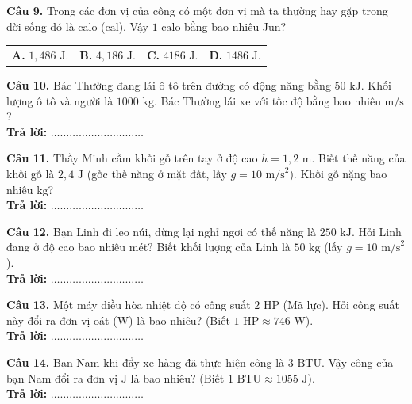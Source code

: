 \documentclass{article}
\begin{document}
\fontsize{28}{36}\selectfont
\textbf{Câu 9.} Trong các đơn vị của công có một đơn vị mà ta thường hay gặp trong đời sống đó là calo ($\text{cal}$). Vậy $1\text{ calo}$ bằng bao nhiêu Jun?
\vspace{16pt}

\begin{tabularx}{\linewidth}{@{}X X X X@{}}
\textbf{A.} $1,486\text{ J}$. & \textbf{B.} $4,186\text{ J}$. & \textbf{C.} $4186\text{ J}$. & \textbf{D.} $1486\text{ J}$.
\end{tabularx}
\vspace*{\fill}
\newpage

\fontsize{25}{33}\selectfont
\textbf{Câu 10.} Bác Thường đang lái ô tô trên đường có động năng bằng $50\text{ kJ}$. Khối lượng ô tô và người là $1000\text{ kg}$. Bác Thường lái xe với tốc độ bằng bao nhiêu $\text{m/s}$?\\
\textbf{Trả lời:} $\dots\dots\dots\dots\dots\dots\dots\dots\dots\dots$

\vspace*{\fill}

\textbf{Câu 11.} Thầy Minh cầm khối gỗ trên tay ở độ cao $h = 1,2\text{ m}$. Biết thế năng của khối gỗ là $2,4\text{ J}$ (gốc thế năng ở mặt đất, lấy $g = 10\text{ m/s}^2$). Khối gỗ nặng bao nhiêu $\text{kg}$?\\
\textbf{Trả lời:} $\dots\dots\dots\dots\dots\dots\dots\dots\dots\dots$
\vspace*{\fill}
\newpage

\fontsize{25}{33}\selectfont
\textbf{Câu 12.} Bạn Linh đi leo núi, dừng lại nghỉ ngơi có thế năng là $250\text{ kJ}$. Hỏi Linh đang ở độ cao bao nhiêu mét? Biết khối lượng của Linh là $50\text{ kg}$ (lấy $g = 10\text{ m/s}^2$).\\
\textbf{Trả lời:} $\dots\dots\dots\dots\dots\dots\dots\dots\dots\dots$

\vspace*{\fill}

\textbf{Câu 13.} Một máy điều hòa nhiệt độ có công suất $2\text{ HP}$ (Mã lực). Hỏi công suất này đổi ra đơn vị oát ($\text{W}$) là bao nhiêu? (Biết $1\text{ HP} \approx 746\text{ W}$).\\
\textbf{Trả lời:} $\dots\dots\dots\dots\dots\dots\dots\dots\dots\dots$
\vspace*{\fill}
\newpage

\fontsize{25}{33}\selectfont
\textbf{Câu 14.} Bạn Nam khi đẩy xe hàng đã thực hiện công là $3\text{ BTU}$. Vậy công của bạn Nam đổi ra đơn vị $\text{J}$ là bao nhiêu? (Biết $1\text{ BTU} \approx 1055\text{ J}$).\\
\textbf{Trả lời:} $\dots\dots\dots\dots\dots\dots\dots\dots\dots\dots$
\end{document}

